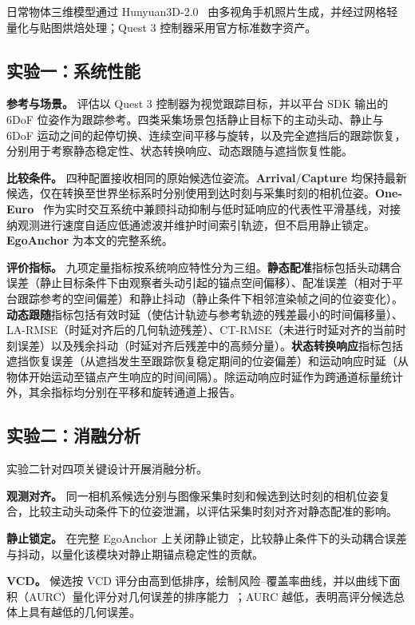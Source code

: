 \documentclass[review]{vgtc}
\begin{document}
日常物体三维模型通过 Hunyuan3D-2.0~\cite{hunyuan3d22025tencent} 由多视角手机照片生成，并经过网格轻量化与贴图烘焙处理；Quest 3 控制器采用官方标准数字资产。

\subsection{实验一：系统性能}\label{sec:exp1-design}

\textbf{参考与场景。}
评估以 Quest 3 控制器为视觉跟踪目标，并以平台 SDK 输出的 6DoF 位姿作为跟踪参考。四类采集场景包括静止目标下的主动头动、静止与 6DoF 运动之间的起停切换、连续空间平移与旋转，以及完全遮挡后的跟踪恢复，分别用于考察静态稳定性、状态转换响应、动态跟随与遮挡恢复性能。

\textbf{比较条件。}
四种配置接收相同的原始候选位姿流。\textbf{Arrival}/\textbf{Capture} 均保持最新候选，仅在转换至世界坐标系时分别使用到达时刻与采集时刻的相机位姿。\textbf{One-Euro}~\cite{casiez2012oneeuro} 作为实时交互系统中兼顾抖动抑制与低时延响应的代表性平滑基线，对接纳观测进行速度自适应低通滤波并维护时间索引轨迹，但不启用静止锁定。\textbf{EgoAnchor} 为本文的完整系统。

\textbf{评价指标。}
九项定量指标按系统响应特性分为三组。\textbf{静态配准}指标包括头动耦合误差（静止目标条件下由观察者头动引起的锚点空间偏移）、配准误差（相对于平台跟踪参考的空间偏差）和静止抖动（静止条件下相邻渲染帧之间的位姿变化）。\textbf{动态跟随}指标包括有效时延（使估计轨迹与参考轨迹的残差最小的时间偏移量）、LA-RMSE（时延对齐后的几何轨迹残差）、CT-RMSE（未进行时延对齐的当前时刻误差）以及残余抖动（时延对齐后残差中的高频分量）。\textbf{状态转换响应}指标包括遮挡恢复误差（从遮挡发生至跟踪恢复稳定期间的位姿偏差）和运动响应时延（从物体开始运动至锚点产生响应的时间间隔）。除运动响应时延作为跨通道标量统计外，其余指标均分别在平移和旋转通道上报告。

\subsection{实验二：消融分析}\label{sec:exp2-design}

实验二针对四项关键设计开展消融分析。

\textbf{观测对齐。}
同一相机系候选分别与图像采集时刻和候选到达时刻的相机位姿复合，比较主动头动条件下的位姿泄漏，以评估采集时刻对齐对静态配准的影响。

\textbf{静止锁定。}
在完整 EgoAnchor 上关闭静止锁定，比较静止条件下的头动耦合误差与抖动，以量化该模块对静止期锚点稳定性的贡献。

\textbf{VCD。}
候选按 VCD 评分由高到低排序，绘制风险--覆盖率曲线，并以曲线下面积（AURC）量化评分对几何误差的排序能力~\cite{riskcontrolled2020,ding2020uncertainty}；AURC 越低，表明高评分候选总体上具有越低的几何误差。
\end{document}
